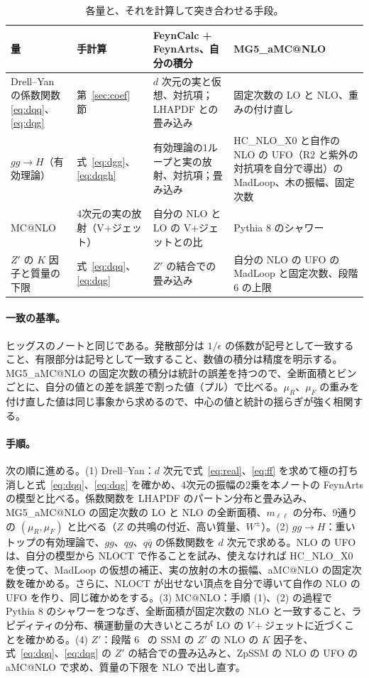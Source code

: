 \documentclass[a4paper,10pt]{ltjsarticle}
\makeatletter
\newcommand{\MGaMC}{MG5\_aMC@NLO}
\makeatother
\begin{document}
\begin{table}[htbp]
\centering\small
\caption{各量と、それを計算して突き合わせる手段。}
\label{tab:plan}
\begin{tabularx}{\linewidth}{>{\raggedright\arraybackslash}p{3.4cm}>{\raggedright\arraybackslash}p{1.6cm}>{\raggedright\arraybackslash}X>{\raggedright\arraybackslash}p{3.6cm}}
\toprule
\textbf{量} & \textbf{手計算} & \textbf{FeynCalc + FeynArts、自分の積分} & \textbf{\MGaMC{}} \\
\midrule
Drell--Yan の係数関数 \eqref{eq:dqq}、\eqref{eq:dqg} & 第~\ref{sec:coef} 節 & $d$ 次元の実と仮想、対抗項；LHAPDF との畳み込み & 固定次数の LO と NLO、重みの付け直し \\
$gg\to H$（有効理論） & 式~\eqref{eq:dgg}、\eqref{eq:dqgh} & 有効理論の1ループと実の放射、対抗項；畳み込み & HC\_NLO\_X0 と自作の NLO の UFO（R2 と紫外の対抗項を自分で導出）の MadLoop、木の振幅、固定次数 \\
MC@NLO & 4次元の実の放射（V$+$ジェット） & 自分の NLO と LO の V$+$ジェットとの比 & Pythia 8 のシャワー \\
$Z'$ の $K$ 因子と質量の下限 & 式~\eqref{eq:dqq}、\eqref{eq:dqg} & $Z'$ の結合での畳み込み & 自分の NLO の UFO の MadLoop と固定次数、段階 6 の上限 \\
\bottomrule
\end{tabularx}
\end{table}

\paragraph{一致の基準。}ヒッグスのノートと同じである。発散部分は $1/\epsilon$ の係数が記号として一致すること、有限部分は記号として一致すること、数値の積分は精度を明示する。\MGaMC{} の固定次数の積分は統計の誤差を持つので、全断面積とビンごとに、自分の値との差を誤差で割った値（プル）で比べる。$\mu_R$、$\mu_F$ の重みを付け直した値は同じ事象から求めるので、中心の値と統計の揺らぎが強く相関する。

\paragraph{手順。}次の順に進める。(1) Drell--Yan：$d$ 次元で式~\eqref{eq:real}、\eqref{eq:ff} を求めて極の打ち消しと式~\eqref{eq:dqq}、\eqref{eq:dqg} を確かめ、4次元の振幅の2乗を本ノートの FeynArts の模型と比べる。係数関数を LHAPDF のパートン分布と畳み込み、\MGaMC{} の固定次数の LO と NLO の全断面積、$m_{\ell\ell}$ の分布、9通りの $(\mu_R,\mu_F)$ と比べる（$Z$ の共鳴の付近、高い質量、$W^\pm$）。(2) $gg\to H$：重いトップの有効理論で、$gg$、$qg$、$q\bar q$ の係数関数を $d$ 次元で求める。NLO の UFO は、自分の模型から NLOCT で作ることを試み、使えなければ HC\_NLO\_X0 を使って、MadLoop の仮想の補正、実の放射の木の振幅、aMC@NLO の固定次数を確かめる。さらに、NLOCT が出せない頂点を自分で導いて自作の NLO の UFO を作り、同じ確かめをする。(3) MC@NLO：手順 (1)、(2) の過程で Pythia 8 のシャワーをつなぎ、全断面積が固定次数の NLO と一致すること、ラピディティの分布、横運動量の大きいところが LO の $V+$ジェットに近づくことを確かめる。(4) $Z'$：段階 6~\cite{env} の SSM の $Z'$ の NLO の $K$ 因子を、式~\eqref{eq:dqq}、\eqref{eq:dqg} の $Z'$ の結合での畳み込みと、ZpSSM の NLO の UFO の aMC@NLO で求め、質量の下限を NLO で出し直す。
\end{document}
